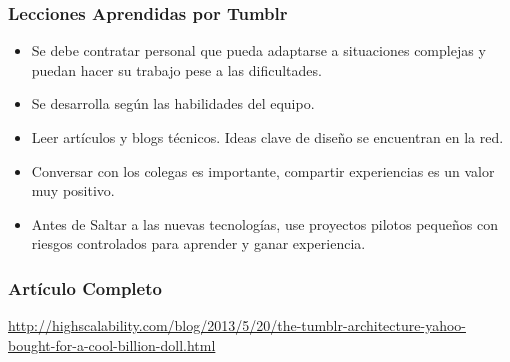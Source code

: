 \documentclass[12pt]{beamer}
\begin{document}
\begin{frame}
 \frametitle{Lecciones Aprendidas por Tumblr}
  \begin{itemize}
   \item<2-> Se debe contratar personal que pueda adaptarse a situaciones complejas y puedan hacer su trabajo pese a las dificultades.
   \item<3-> Se desarrolla según las habilidades del equipo.
   \item<4-> Leer artículos y blogs técnicos. Ideas clave de diseño se encuentran en la red.
   \item<5-> Conversar con los colegas es importante, compartir experiencias es un valor muy positivo.
   \item<6-> Antes de Saltar a las nuevas tecnologías, use proyectos pilotos pequeños con riesgos controlados para aprender y ganar experiencia.
  \end{itemize}
\end{frame}

\begin{frame}
 \frametitle{Artículo Completo}
  
  \href{http://highscalability.com/blog/2013/5/20/the-tumblr-architecture-yahoo-bought-for-a-cool-billion-doll.html}{http://highscalability.com/blog/2013/5/20/the-tumblr-architecture-yahoo-bought-for-a-cool-billion-doll.html}
\end{frame}




\end{document}
